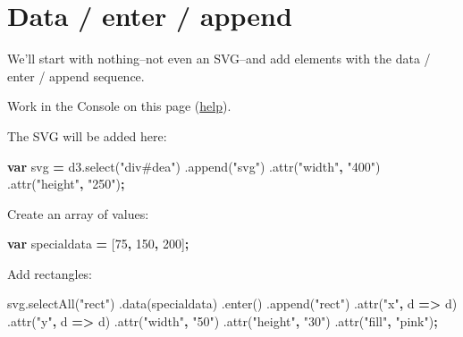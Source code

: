 \documentclass[openany]{book}
\newenvironment{Shaded}{\begin{snugshade}}{\end{snugshade}}
\newcommand{\AttributeTok}[1]{\textcolor[rgb]{0.77,0.63,0.00}{#1}}
\newcommand{\DecValTok}[1]{\textcolor[rgb]{0.00,0.00,0.81}{#1}}
\newcommand{\KeywordTok}[1]{\textcolor[rgb]{0.13,0.29,0.53}{\textbf{#1}}}
\newcommand{\NormalTok}[1]{#1}
\newcommand{\OperatorTok}[1]{\textcolor[rgb]{0.81,0.36,0.00}{\textbf{#1}}}
\newcommand{\StringTok}[1]{\textcolor[rgb]{0.31,0.60,0.02}{#1}}
\newcommand{\VariableTok}[1]{\textcolor[rgb]{0.00,0.00,0.00}{#1}}
\begin{document}
\hypertarget{data-enter-append}{%
\section{Data / enter / append }\label{data-enter-append}}

We'll start with nothing--not even an SVG--and add elements with the data / enter / append sequence.

Work in the Console on this page (\href{index.html\#this-book-console}{help}).

The SVG will be added here:

\hypertarget{dea}{}

\begin{Shaded}
\begin{Highlighting}[]
\KeywordTok{var}\NormalTok{ svg }\OperatorTok{=} \VariableTok{d3}\NormalTok{.}\AttributeTok{select}\NormalTok{(}\StringTok{"div#dea"}\NormalTok{)}
\NormalTok{  .}\AttributeTok{append}\NormalTok{(}\StringTok{"svg"}\NormalTok{)}
\NormalTok{  .}\AttributeTok{attr}\NormalTok{(}\StringTok{"width"}\OperatorTok{,} \StringTok{"400"}\NormalTok{)}
\NormalTok{  .}\AttributeTok{attr}\NormalTok{(}\StringTok{"height"}\OperatorTok{,} \StringTok{"250"}\NormalTok{)}\OperatorTok{;}
\end{Highlighting}
\end{Shaded}

Create an array of values:

\begin{Shaded}
\begin{Highlighting}[]
\KeywordTok{var}\NormalTok{ specialdata }\OperatorTok{=}\NormalTok{ [}\DecValTok{75}\OperatorTok{,} \DecValTok{150}\OperatorTok{,} \DecValTok{200}\NormalTok{]}\OperatorTok{;}
\end{Highlighting}
\end{Shaded}

Add rectangles:

\begin{Shaded}
\begin{Highlighting}[]
  \VariableTok{svg}\NormalTok{.}\AttributeTok{selectAll}\NormalTok{(}\StringTok{"rect"}\NormalTok{)}
\NormalTok{    .}\AttributeTok{data}\NormalTok{(specialdata)}
\NormalTok{    .}\AttributeTok{enter}\NormalTok{()}
\NormalTok{    .}\AttributeTok{append}\NormalTok{(}\StringTok{"rect"}\NormalTok{)}
\NormalTok{      .}\AttributeTok{attr}\NormalTok{(}\StringTok{"x"}\OperatorTok{,}\NormalTok{ d }\OperatorTok{=>}\NormalTok{ d)}
\NormalTok{      .}\AttributeTok{attr}\NormalTok{(}\StringTok{"y"}\OperatorTok{,}\NormalTok{ d }\OperatorTok{=>}\NormalTok{ d)}
\NormalTok{      .}\AttributeTok{attr}\NormalTok{(}\StringTok{"width"}\OperatorTok{,} \StringTok{"50"}\NormalTok{)}
\NormalTok{      .}\AttributeTok{attr}\NormalTok{(}\StringTok{"height"}\OperatorTok{,} \StringTok{"30"}\NormalTok{)}
\NormalTok{      .}\AttributeTok{attr}\NormalTok{(}\StringTok{"fill"}\OperatorTok{,} \StringTok{"pink"}\NormalTok{)}\OperatorTok{;}
\end{Highlighting}
\end{Shaded}
\end{document}
